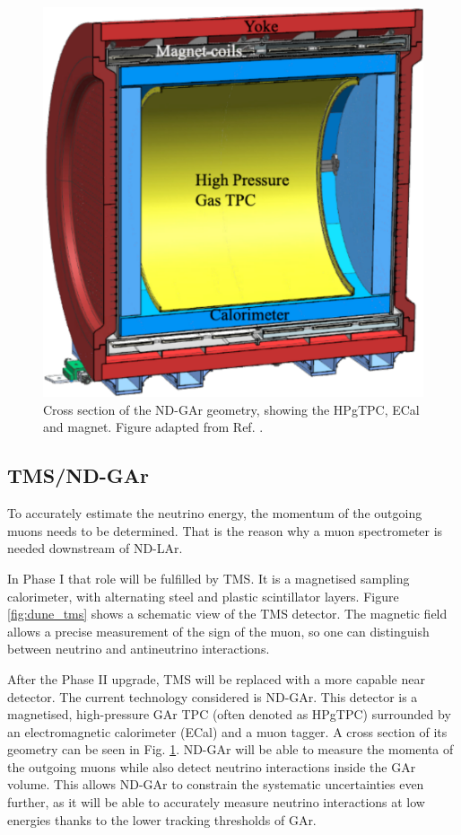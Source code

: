 \begin{figure}[t]
	\centering
	\includegraphics[width=0.45\linewidth]{Images/DUNE/ND/nd_gar}
	\caption[Cross section of the ND-GAr geometry, showing the HPgTPC, ECal and magnet.]{Cross section of the ND-GAr geometry, showing the HPgTPC, ECal and magnet. Figure adapted from Ref. \cite{DUNE2024Phase2}.}
	\label{fig:dune_nd_gar}
\end{figure}

\subsection{TMS/ND-GAr}

To accurately estimate the neutrino energy, the momentum of the outgoing muons needs to be determined. That is the reason why a muon spectrometer is needed downstream of ND-LAr.

In Phase I that role will be fulfilled by TMS. It is a magnetised sampling calorimeter, with alternating steel and plastic scintillator layers. Figure \ref{fig:dune_tms} shows a schematic view of the TMS detector. The magnetic field allows a precise measurement of the sign of the muon, so one can distinguish between neutrino and antineutrino interactions.

After the Phase II upgrade, TMS will be replaced with a more capable near detector. The current technology considered is ND-GAr. This detector is a magnetised, high-pressure GAr TPC (often denoted as HPgTPC) surrounded by an electromagnetic calorimeter (ECal) and a muon tagger. A cross section of its geometry can be seen in Fig. \ref{fig:dune_nd_gar}. ND-GAr will be able to measure the momenta of the outgoing muons while also detect neutrino interactions inside the GAr volume. This allows ND-GAr to constrain the systematic uncertainties even further, as it will be able to accurately measure neutrino interactions at low energies thanks to the lower tracking thresholds of GAr.

